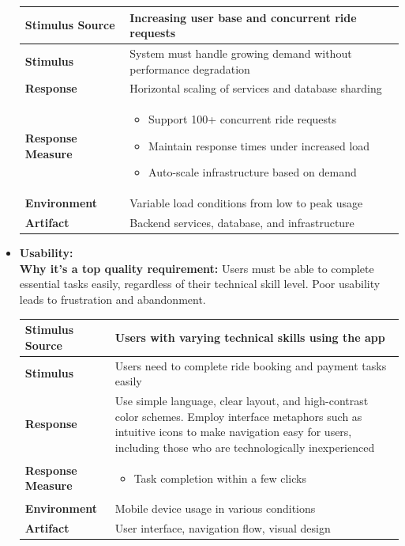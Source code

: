 \documentclass[12pt]{article}
\begin{document}
\begin{itemize}
  \begin{table}[H]
\centering
\begin{tabular}{|l|p{10cm}|}
\hline
\textbf{Stimulus Source} & Increasing user base and concurrent ride requests \\
\hline
\textbf{Stimulus} & System must handle growing demand without performance degradation \\
\hline
\textbf{Response} & Horizontal scaling of services and database sharding \\
\hline
\textbf{Response Measure} & 
\begin{itemize}
  \item Support 100+ concurrent ride requests
  \item Maintain response times under increased load
  \item Auto-scale infrastructure based on demand
\end{itemize} \\
\hline
\textbf{Environment} & Variable load conditions from low to peak usage \\
\hline
\textbf{Artifact} & Backend services, database, and infrastructure \\
\hline
\end{tabular}
\end{table}

  \item \textbf{Usability:} \\
  \textbf{Why it's a top quality requirement:} Users must be able to complete essential tasks easily, regardless of their technical skill level. Poor usability leads to frustration and abandonment. \\

\begin{table}[H]
\centering
\begin{tabular}{|l|p{10cm}|}
\hline
\textbf{Stimulus Source} & Users with varying technical skills using the app \\
\hline
\textbf{Stimulus} & Users need to complete ride booking and payment tasks easily \\
\hline
\textbf{Response} & Use simple language, clear layout, and high-contrast color schemes. Employ interface metaphors such as intuitive icons to make navigation easy for users, including those who are technologically inexperienced \\
\hline
\textbf{Response Measure} & 
\begin{itemize}
  \item Task completion within a few clicks
\end{itemize} \\
\hline
\textbf{Environment} & Mobile device usage in various conditions \\
\hline
\textbf{Artifact} & User interface, navigation flow, visual design \\
\hline
\end{tabular}
\end{table}


\end{itemize}
\end{document}
